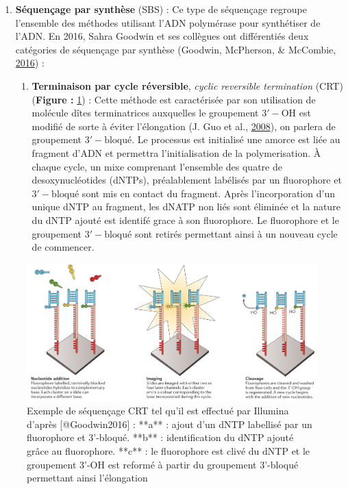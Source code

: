 \documentclass[12pt,twoside]{reedthesis}
\providecommand{\tightlist}{%
  \setlength{\itemsep}{0pt}\setlength{\parskip}{0pt}}
\theoremstyle{definition}
\theoremstyle{definition}
\theoremstyle{remark}
\begin{document}
  \begin{enumerate}
  \def\labelenumi{\arabic{enumi}.}
  \tightlist
  \item
    \textbf{Séquençage par synthèse} (SBS) : Ce type de séquençage
    regroupe l'ensemble des méthodes utilisant l'ADN polymérase pour
    synthétiser de l'ADN. En 2016, Sahra Goodwin et ses collègues ont
    différentiés deux catégories de séquençage par synthèse (Goodwin,
    McPherson, \& McCombie, \protect\hyperlink{ref-Goodwin2016}{2016}) :
  
    \begin{enumerate}
    \def\labelenumii{\alph{enumii}.}
    \tightlist
    \item
      \textbf{Terminaison par cycle réversible}, \emph{cyclic reversible
      termination} (CRT) (\textbf{Figure : }\ref{fig:crtSeq}) : Cette
      méthode est caractérisée par son utilisation de molécule dîtes
      terminatrices auxquelles le groupement \(\mathrm{3'-OH}\) est
      modifié de sorte à éviter l'élongation (J. Guo et al.,
      \protect\hyperlink{ref-Guo2008}{2008}), on parlera de groupement
      \(\mathrm{3'-bloqué}\). Le processus est initialisé une amorce est
      liée au fragment d'ADN et permettra l'initialisation de la
      polymerisation. À chaque cycle, un mixe comprenant l'ensemble des
      quatre de desoxynucléotides (dNTPs), préalablement labélisés par un
      fluorophore et \(\mathrm{3'-bloqué}\) sont mis en contact du
      fragment. Après l'incorporation d'un unique dNTP au fragment, les
      dNATP non liés sont éliminée et la nature du dNTP ajouté est
      identifé grace à son fluorophore. Le fluorophore et le groupement
      \(\mathrm{3'-bloqué}\) sont retirés permettant ainsi à un nouveau
      cycle de commencer.
    \end{enumerate}
  \end{enumerate}
  
  \begin{figure}
  
  {\centering \includegraphics[scale=.28]{figure/CRT_seq_illumina} 
  
  }
  
  \caption[Exemple de séquençage CRT tel qu'il est effectué par Illumina]{Exemple de séquençage CRT tel qu'il est effectué par Illumina d'après [@Goodwin2016] : **a** : ajout d'un dNTP labellisé par un fluorophore et 3'-bloqué. **b** : identification du dNTP ajouté grâce au fluorophore. **c** : le fluorophore est clivé du dNTP et le groupement 3'-OH est reformé à partir du groupement 3'-bloqué permettant ainsi l'élongation}\label{fig:crtSeq}
  \end{figure}
  
\end{document}
